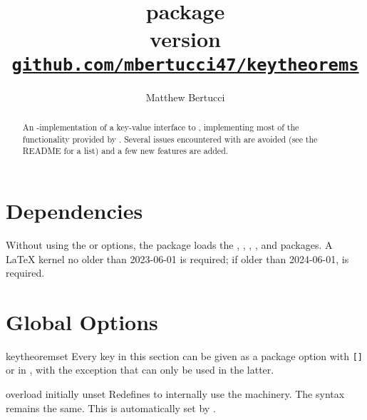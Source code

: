 \documentclass{ltxdoc}
\title{%
  \pkg{keytheorems} package \\[1ex]
  \large version \version \\[1ex]
  \href{https://github.com/mbertucci47/keytheorems}
    {\texttt{github.com/mbertucci47/keytheorems}}
  }
\author{Matthew Bertucci}
\newcommand{\bracks}[1]{\texttt{[#1]}}
\newcommand{\ttbraces}[1]{\braces{\texttt{#1}}}
\begin{document}
\maketitle

\begin{abstract}
An -implementation of a key-value interface to , implementing most of the functionality provided by .
Several issues encountered with  are avoided (see the README for a list) and a few new features are added.
\end{abstract}

\tableofcontents

\section{Dependencies}

Without using the  or  options, the package loads the , , , , and  packages.
A \LaTeX{} kernel no older than 2023-06-01 is required; if older than 2024-06-01,  is required.
    
\section{Global Options}

\begin{docCommand}{keytheoremset}
  {}
Every key in this section can be given as a package option with \bracks{}\ttbraces{keytheorems} or in , with the exception that  can only be used in the latter.
\end{docCommand}

\begin{docKey}{overload}
  {}
  {initially unset}
Redefines  to internally use the  machinery. The syntax remains the same.
This is automatically set by .
\end{docKey}
\end{document}
